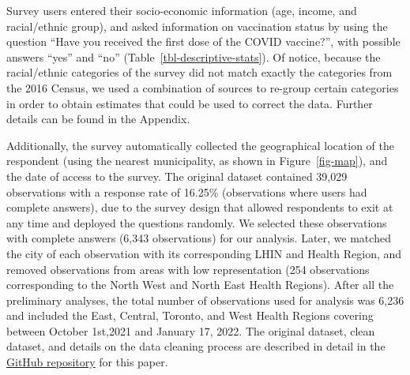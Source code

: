 \documentclass[
]{article}
\begin{document}
Survey users entered their socio-economic information (age, income, and
racial/ethnic group), and asked information on vaccination status by
using the question ``Have you received the first dose of the COVID
vaccine?'', with possible answers ``yes'' and ``no''
(Table~\ref{tbl-descriptive-stats}). Of notice, because the
racial/ethnic categories of the survey did not match exactly the
categories from the 2016 Census, we used a combination of sources to
re-group certain categories in order to obtain estimates that could be
used to correct the data. Further details can be found in the Appendix.

Additionally, the survey automatically collected the geographical
location of the respondent (using the nearest municipality, as shown in
Figure~\ref{fig-map}), and the date of access to the survey. The
original dataset contained 39,029 observations with a response rate of
16.25\% (observations where users had complete answers), due to the
survey design that allowed respondents to exit at any time and deployed
the questions randomly. We selected these observations with complete
answers (6,343 observations) for our analysis. Later, we matched the
city of each observation with its corresponding LHIN and Health Region,
and removed observations from areas with low representation (254
observations corresponding to the North West and North East Health
Regions). After all the preliminary analyses, the total number of
observations used for analysis was 6,236 and included the East, Central,
Toronto, and West Health Regions covering between October 1st,2021 and
January 17, 2022. The original dataset, clean dataset, and details on
the data cleaning process are described in detail in the
\href{https://github.com/aimundo/Fields_COVID-19/}{GitHub repository}
for this paper.
\end{document}
